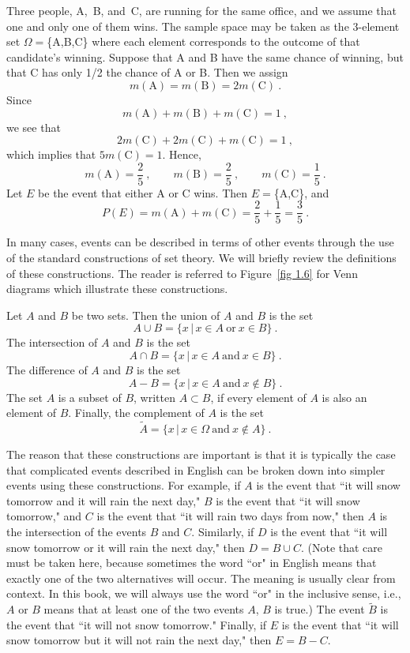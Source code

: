 \begin{example}\label{exam 1.7}
Three people, A,~B, and~C, are running for the same office, and we assume
that
one and only one of them wins.  The sample space may be taken as the
3-element
set $\Omega = $\{A,B,C\} where each element corresponds to the outcome of
that candidate's winning.  Suppose that A and B have the same chance of
winning, but that C has only 1/2 the chance of A or B.  Then we assign
$$
m(\mbox{A}) = m(\mbox{B}) = 2m(\mbox{C})\ .
$$
Since
$$
m(\mbox{A}) + m(\mbox{B}) + m(\mbox{C}) = 1\ ,
$$
we see that
$$
2m(\mbox{C}) + 2m(\mbox{C}) + m(\mbox{C}) = 1\ ,
$$
which implies that $5m(\mbox{C}) = 1$.  Hence,
$$
m(\mbox{A}) = \frac25\ , \qquad m(\mbox{B}) = \frac25\ , \qquad m(\mbox{C}) =
\frac15\ .
$$
Let $E$ be the event that either A or C wins.  Then $E = $\{A,C\}, and
$$
P(E) = m(\mbox{A}) + m(\mbox{C}) = \frac25 + \frac15 = \frac35\ .
$$
\end{example}
\par
In many cases, events can be described in terms of other events through the use of
the standard constructions of set theory.  We will briefly review the definitions
of these constructions.  The reader is referred to Figure~\ref{fig 1.6} for Venn diagrams
which illustrate these constructions. 
\par
Let $A$ and $B$ be two sets.  Then the union of $A$ and $B$ is the set
$$A \cup B = \{x\,|\, x \in A\ \mbox{or}\ x \in B\}\ .$$
The intersection of $A$ and $B$ is the set
$$A \cap B = \{x\,|\, x \in A\ \mbox{and}\ x \in B\}\ .$$
The difference of $A$ and $B$ is the set
$$A - B = \{x\,|\, x \in A\ \mbox{and}\ x \not \in B\}\ .$$
The set $A$ is a subset of $B$, written 
$A \subset B$, if every element of $A$ is also an element of $B$.  Finally,
the complement of $A$ is the set
$$\tilde A = \{x\,|\, x \in \Omega\ \mbox{and}\ x \not \in A\}\ .$$
\par
The reason that these constructions are important is that it is typically the
case that
complicated events described in English can be broken down into simpler
events using
these constructions.  For example, if $A$ is the event that ``it will snow
tomorrow and it
will rain the next day," $B$ is the event that ``it will snow tomorrow," and
$C$ is
the event that ``it will rain two days from now," then $A$ is the intersection
of the events
$B$ and $C$.  Similarly, if $D$ is the event that ``it will snow tomorrow or
it will rain the next day," then $D = B \cup C$.  (Note that care must be
taken here,
because sometimes the word ``or" in English means that exactly one of the two
alternatives
will occur.  The meaning is usually clear from context.  In this book, we
will always use
the word ``or" in the inclusive sense, i.e., $A$ or $B$ means that at least
one of the two
events $A$, $B$ is true.)  The event $\tilde B$ is the event that ``it will
not snow
tomorrow."  Finally, if $E$ is the event that ``it will snow tomorrow but it
will not rain 
the next day," then $E = B - C$. 

